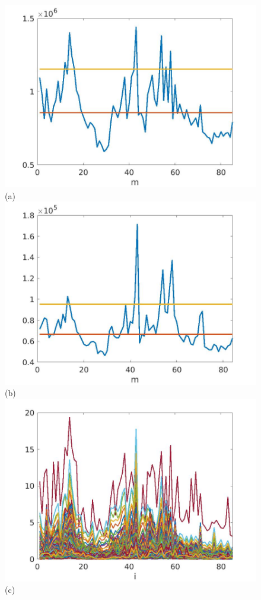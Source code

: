 \documentclass[journal]{IEEEtran}
\begin{document}
\begin{figure}[htp!]
\includegraphics[scale=.12]{../../figs/J3_VV_squared_meandev}(a)
\includegraphics[scale=.12]{../../figs/consecdif_J3_VV_squared_meandev}(b)\\
\includegraphics[scale=.12]{../../figs/J3_VV_sqrdif_change_locations}(c)

\end{figure}
\end{document}

